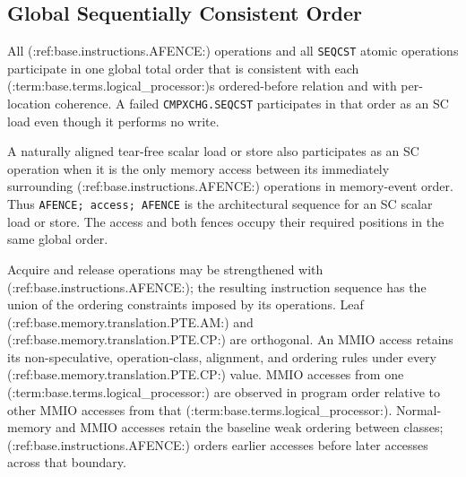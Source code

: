 \subsection{Global Sequentially Consistent Order}
All (:ref:base.instructions.AFENCE:) operations and all \texttt{SEQCST} atomic operations participate in one global total order that is
consistent with each (:term:base.terms.logical_processor:)\textquotesingle{}s ordered-before relation and with per-location coherence. A failed
\texttt{CMPXCHG.SEQCST} participates in that order as an SC load even though it performs no write.

A naturally aligned tear-free scalar load or store also participates as an SC operation when it is the only memory
access between its immediately surrounding (:ref:base.instructions.AFENCE:) operations in memory-event order. Thus
\texttt{AFENCE; access; AFENCE} is the architectural sequence for an SC scalar load or store. The access and both
fences occupy their required positions in the same global order.

Acquire and release operations may be strengthened with (:ref:base.instructions.AFENCE:); the resulting instruction sequence has the
union of the ordering constraints imposed by its operations.
Leaf (:ref:base.memory.translation.PTE.AM:) and (:ref:base.memory.translation.PTE.CP:) are orthogonal. An MMIO access retains its non-speculative,
operation-class, alignment, and ordering rules under every (:ref:base.memory.translation.PTE.CP:) value. MMIO
accesses from one (:term:base.terms.logical_processor:) are observed in program order relative to
other MMIO accesses from that (:term:base.terms.logical_processor:). Normal-memory and MMIO
accesses retain the baseline weak ordering between classes; (:ref:base.instructions.AFENCE:)
orders earlier accesses before later accesses across that boundary.
